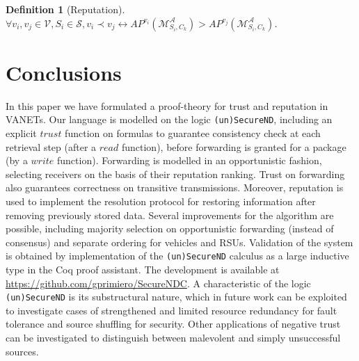 \documentclass[compsoc, conference, letterpaper, 10pt, times]{IEEEtran}
\newtheorem{definition}{Definition}
\begin{document}
\begin{definition}[Reputation]
$\forall v_{i}, v_{j}\in \mathcal{V}, S_{i}\in \mathcal{S}, v_{i}\prec v_{j} \leftrightarrow AP^{v_{i}}(\mathcal{M}^{\mathcal{A}}_{S_{i}, C_{k}})>AP^{v_{j}}(\mathcal{M}^{\mathcal{A}}_{S_{i}, C_{k}})$.
\end{definition}

\section{Conclusions}

In this paper we have formulated a proof-theory for trust and reputation in VANETs. Our language is modelled on the logic \texttt{(un)SecureND}, including an explicit $trust$ function on formulas to guarantee consistency check at each retrieval step (after a $read$ function), before forwarding is granted for a package (by a $write$ function). Forwarding is modelled in an opportunistic fashion, selecting receivers on the basis of their reputation ranking. Trust on forwarding also guarantees correctness on transitive transmissions. Moreover, reputation is used to implement the resolution protocol for restoring information after removing previously stored data. Several improvements for the algorithm are possible, including majority selection on opportunistic forwarding (instead of consensus) and separate ordering for vehicles and RSUs. 
Validation of the system is obtained by implementation of the \texttt{(un)SecureND} calculus as a large inductive type in the Coq proof assistant. The development is available at \url{https://github.com/gprimiero/SecureNDC}. 
A characteristic of the logic \texttt{(un)SecureND} is its substructural nature, which in future work can be exploited to investigate cases of strengthened and limited resource redundancy for fault tolerance and source shuffling for security. Other applications of negative trust can be investigated to distinguish between malevolent and simply unsuccessful sources.
\end{document}
